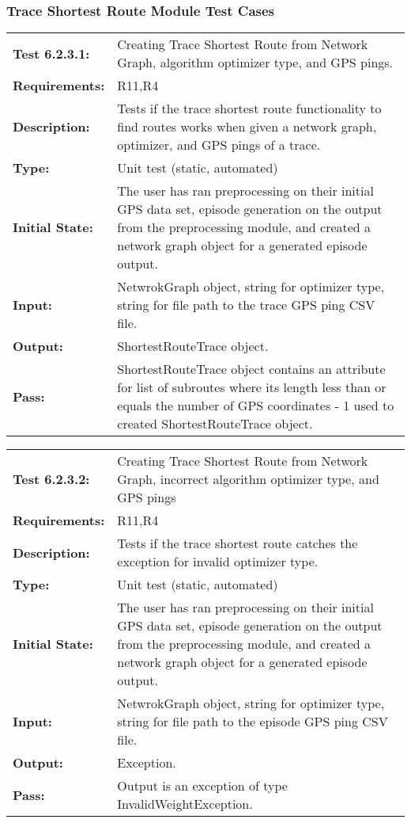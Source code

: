 \documentclass[12pt, titlepage]{article}
\begin{document}
{\subsubsection{Trace Shortest Route Module Test Cases}
\begin{tabular}{|l|p{10cm}|}
    \hline
    \bf{Test} 6.2.3.1: & Creating Trace Shortest Route from Network Graph, algorithm optimizer type, and GPS pings. \\
    \bf{Requirements}: & R11,R4 \\
    \bf{Description}: & Tests if the trace shortest route functionality to find routes works when given a network graph, optimizer, and GPS pings of a trace. \\
    \bf{Type}: & Unit test (static, automated) \\
    \bf{Initial State}: & The user has ran preprocessing on their initial GPS data set, episode generation on the output from the preprocessing module, and created a network graph object for a generated episode output. \\
    \bf{Input}: & NetwrokGraph object, string for optimizer type, string for file path to the trace GPS ping CSV file. \\
    \bf{Output}: & ShortestRouteTrace object. \\
    \bf{Pass}: & ShortestRouteTrace object contains an attribute for list of subroutes where its length less than or equals the number of GPS coordinates - 1 used to created ShortestRouteTrace object. \\
    \hline
\end{tabular}
\begin{tabular}{|l|p{10cm}|}
    \hline
    \bf{Test} 6.2.3.2: & Creating Trace Shortest Route from Network Graph, incorrect algorithm optimizer type, and GPS pings \\
    \bf{Requirements}: & R11,R4 \\
    \bf{Description}: & Tests if the trace shortest route catches the exception for invalid optimizer type. \\
    \bf{Type}: & Unit test (static, automated) \\
    \bf{Initial State}: & The user has ran preprocessing on their initial GPS data set, episode generation on the output from the preprocessing module, and created a network graph object for a generated episode output. \\
    \bf{Input}: & NetwrokGraph object, string for optimizer type, string for file path to the episode GPS ping CSV file. \\
    \bf{Output}: & Exception. \\
    \bf{Pass}: & Output is an exception of type InvalidWeightException. \\
    \hline
\end{tabular}
}
\end{document}
